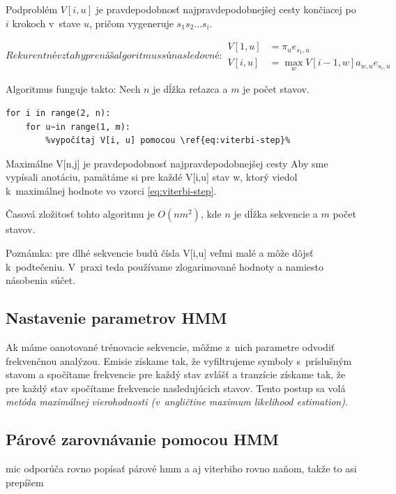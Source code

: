 Podproblém $V[i,u]$ je pravdepodobnosť najpravdepodobnejšej cesty končiacej po $i$ krokoch v~stave $u$, pričom vygeneruje $s_1 s_2 \dots s_i$.

\begin{subequations}
Rekurentné vzťahy pre náš algoritmus sú nasledovné:
\begin{align}
        \label{eq:viterbi-init}
        V[1,u] &= \pi_u e_{s_1, u}\\
        \label{eq:viterbi-step}
        V[i,u] &= \max_w V[i-1, w] a_{w,u} e_{s_i, u}
\end{align}
\end{subequations}

Algoritmus funguje takto:
Nech $n$ je dĺžka reťazca a $m$ je počet stavov.

\begin{lstlisting}[escapechar=\%]
%Nainicializuj $V[1,i]\, \forall i$ podľa \ref{eq:viterbi-init}%
for i in range(2, n):
    for u~in range(1, m):
        %vypočítaj V[i, u] pomocou \ref{eq:viterbi-step}%
\end{lstlisting}
Maximálne V[n,j] je pravdepodobnosť najpravdepodobnejšej cesty
Aby sme vypísali anotáciu, pamätáme si pre každé V[i,u] stav w, ktorý viedol k~maximálnej hodnote vo vzorci \ref{eq:viterbi-step}.

Časová zložitosť tohto algoritmu je $O(nm^2)$, kde $n$ je dĺžka sekvencie a $m$ počet stavov.

Poznámka: pre dlhé sekvencie budú čísla V[i,u] veľmi malé a môže dôjsť k~podtečeniu. V~praxi teda používame zlogarimované hodnoty a namiesto násobenia súčet.

\subsection{Nastavenie parametrov HMM}
\label{subsec:hmmtraining}
Ak máme oanotované trénovacie sekvencie, môžme z~nich parametre odvodiť frekvenčnou analýzou. Emisie získame tak, že vyfiltrujeme symboly s~príslušným stavom a spočítame frekvencie pre každý stav zvlášť a tranzície získame tak, že pre každý stav spočítame frekvencie nasledujúcich stavov. Tento postup sa volá \textit{metóda maximálnej vierohodnosti (v~angličtine maximum likelihood estimation)}. \cite{ durbin, wiki:mle}

\subsection{Párové zarovnávanie pomocou HMM}
\todo mic odporúča rovno popísať párové hmm a aj viterbiho rovno naňom, takže to asi prepíšem

